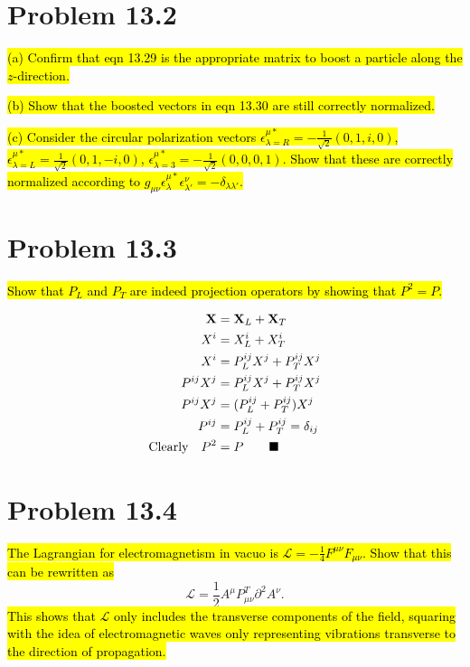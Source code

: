 \documentclass{article}
\begin{document}
\section*{Problem 13.2}
\begin{quoting}
  \hl{(a)  Confirm that eqn 13.29 is the appropriate matrix to boost a particle along the $z$-direction.}

  \hl{(b)  Show that the boosted vectors in eqn 13.30 are still correctly normalized.}

  \hl{(c)  Consider the circular polarization vectors $\epsilon^{\mu*}_{\lambda=R}=-\frac{1}{\sqrt{2}}(0,1,i,0)$, $\epsilon^{\mu*}_{\lambda=L}=\frac{1}{\sqrt{2}}(0,1,-i,0)$, $\epsilon^{\mu*}_{\lambda=3}=-\frac{1}{\sqrt{2}}(0,0,0,1)$. Show that these are correctly normalized according to $g_{\mu\nu}\epsilon^{\mu*}_\lambda \epsilon^\nu_{\lambda'}=-\delta_{\lambda\lambda'}$.}
\end{quoting}

\section*{Problem 13.3}
\begin{quoting}
  \hl{Show that $P_L$ and $P_T$ are indeed projection operators by showing that $P^2=P$.}
\end{quoting}
\begin{align*}
  \vb{X}           & =\vb{X}_L+\vb{X}_T             \\
  X^i              & =X^i_L+X^i_T                   \\
  X^i              & =P^{ij}_LX^j+P^{ij}_TX^j       \\
  P^{ij}X^j        & =P^{ij}_LX^j+P^{ij}_TX^j       \\
  P^{ij}X^j        & =(P^{ij}_L+P^{ij}_T)X^j        \\
  P^{ij}           & =P^{ij}_L+P^{ij}_T=\delta_{ij} \\
  \qq*{Clearly}P^2 & =P\qquad\blacksquare
\end{align*}



\section*{Problem 13.4}
\begin{quoting}
  \hl{The Lagrangian for electromagnetism in vacuo is $\mathcal{L}=-\frac{1}{4}F^{\mu\nu}F_{\mu\nu}$. Show that this can be rewritten as}\[\mathcal{L}=\frac{1}{2}A^\mu P^T_{\mu\nu}\partial^2A^\nu.\]
  \hl{This shows that $\mathcal{L}$ only includes the transverse components of the field, squaring with the idea of electromagnetic waves only representing vibrations transverse to the direction of propagation.}
\end{quoting}
\end{document}
